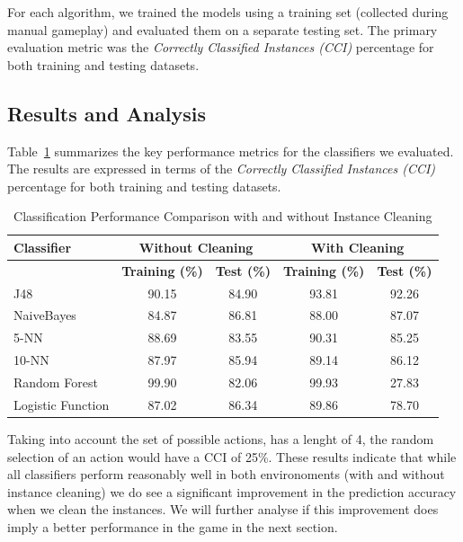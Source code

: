 \documentclass[12pt,a4paper]{article}
\begin{document}
For each algorithm, we trained the models using a training set (collected during manual gameplay) and evaluated them on a separate testing set. The primary evaluation metric was the \textit{Correctly Classified Instances (CCI)} percentage for both training and testing datasets.

\subsection{Results and Analysis}
Table~\ref{tab:results} summarizes the key performance metrics for the classifiers we evaluated. The results are expressed in terms of the \textit{Correctly Classified Instances (CCI)} percentage for both training and testing datasets.

\begin{table}[ht]
\centering
\caption{Classification Performance Comparison with and without Instance Cleaning}
\label{tab:results}
\begin{tabular}{lcccc}
\hline
\textbf{Classifier} & \multicolumn{2}{c}{\textbf{Without Cleaning}} & \multicolumn{2}{c}{\textbf{With Cleaning}} \\ \hline
                    & \textbf{Training (\%)} & \textbf{Test (\%)} & \textbf{Training (\%)} & \textbf{Test (\%)} \\ \hline
J48                 & 90.15                       & 84.90                     & 93.81                       & 92.26                     \\
NaiveBayes          & 84.87                       & 86.81                     & 88.00                       & 87.07                     \\
5-NN                & 88.69                       & 83.55                     & 90.31                       & 85.25                     \\
10-NN               & 87.97                       & 85.94                     & 89.14                       & 86.12                    \\
Random Forest       & 99.90                       & 82.06                     & 99.93                       & 27.83                    \\ 
Logistic Function   & 87.02                       & 86.34                     & 89.86                       & 78.70                     \\\hline
\end{tabular}
\end{table}

Taking into account the set of possible actions, has a lenght of 4, the random selection of an action would have a CCI of 25\%.
These results indicate that while all classifiers perform reasonably well in both environoments (with and without instance cleaning)
we do see a significant improvement in the prediction accuracy when we clean the instances.
We will further analyse if this improvement does imply a better performance in the game in the next section.
\end{document}
